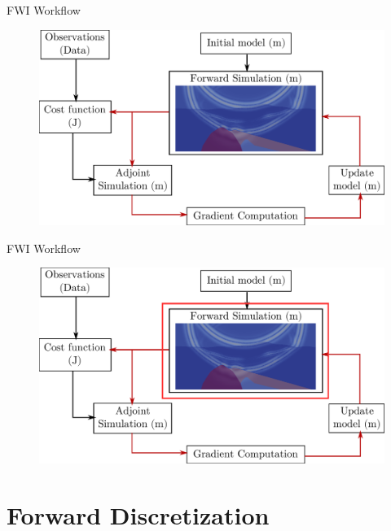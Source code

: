 \begin{frame}[noframenumbering]{FWI Workflow}
\begin{figure}
  \includegraphics[scale=0.31]{fwi_test.pdf}
\end{figure}
\end{frame}

\begin{frame}[noframenumbering]{FWI Workflow}
\begin{figure}
  \includegraphics[scale=0.31]{fwi_test3.pdf}
\end{figure}
\end{frame}



{
  \AtBeginSection[]{}
}
\section{Forward Discretization}
